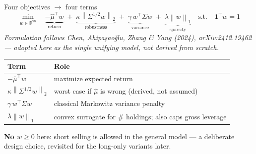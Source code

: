 \documentclass[aspectratio=169]{beamer}
\newcommand{\R}{\mathbb{R}}
\newcommand{\muhat}{\hat{\mu}}
\newcommand{\Sig}{\Sigma}
\newcommand{\Ssqrt}{\Sigma^{1/2}}
\newcommand{\one}{\mathbf{1}}
\newcommand{\norm}[1]{\left\lVert #1 \right\rVert}
\begin{document}
\begin{frame}{Four objectives $\to$ four terms}
  \begin{equation}\label{eq:main}
    \min_{w \in \R^{98}} \quad
      \underbrace{-\muhat^\top w}_{\text{return}}
      \;+\; \underbrace{\kappa \norm{\Ssqrt w}_2}_{\text{robustness}}
      \;+\; \underbrace{\gamma\, w^\top \Sig w}_{\text{variance}}
      \;+\; \underbrace{\lambda \norm{w}_1}_{\text{sparsity}}
    \quad \text{s.t.} \quad \one^\top w = 1
  \end{equation}
  \small \textit{Formulation follows Chen, Ahipa\c{s}ao\u{g}lu, Zhang \& Yang (2024),
  arXiv:2412.19462 --- adopted here as the single unifying model, not derived from scratch.}
  \vspace{0.2cm}
  \begin{table}
  \small
  \begin{tabular}{@{}ll@{}}
  \toprule
  \textbf{Term} & \textbf{Role} \\
  \midrule
  $-\muhat^\top w$ & maximize expected return \\
  $\kappa \norm{\Ssqrt w}_2$ & worst case if $\muhat$ is wrong (derived, not assumed) \\
  $\gamma\, w^\top \Sig w$ & classical Markowitz variance penalty \\
  $\lambda \norm{w}_1$ & convex surrogate for \# holdings; also caps gross leverage \\
  \bottomrule
  \end{tabular}
  \end{table}
  \textbf{No $w \ge 0$} here: short selling is allowed in the general model --- a deliberate
  design choice, revisited for the long-only variants later.
\end{frame}
\end{document}
